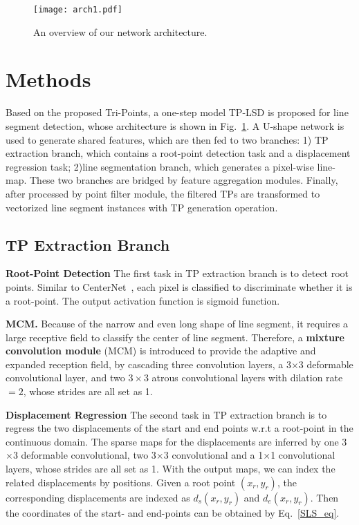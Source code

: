 \documentclass[runningheads]{llncs}
\begin{document}
\begin{figure}[t]
\centering
\texttt{[image: arch1.pdf]}
\caption{An overview of our network architecture.}
\label{arch}
\end{figure}


\section{Methods}


Based on the proposed Tri-Points, a one-step model TP-LSD is proposed for line segment detection, whose architecture is shown in Fig.~\ref{arch}. A U-shape network is used to generate shared features, which are then fed to two branches: 1) TP extraction branch, which contains a root-point detection task and a displacement regression task; 2)line segmentation branch, which generates a pixel-wise line-map. These two branches are bridged by feature aggregation modules. Finally, after processed by point filter module, the filtered TPs are transformed to vectorized line segment instances with TP generation operation.


\subsection{TP Extraction Branch}

\textbf{Root-Point Detection}
The first task in TP extraction branch is to detect root points. Similar to CenterNet~\cite{CenterNet}, each pixel is classified to discriminate whether it is a root-point. The output activation function is sigmoid function.

\textbf{MCM.}
Because of the narrow and even long shape of line segment, it requires a large receptive field to classify the center of line segment. Therefore, a \textbf{mixture convolution module} (MCM) is introduced to provide the adaptive and expanded reception field, by cascading three convolution layers, a 3$\times$3 deformable convolutional layer, and two $3 \times 3$ atrous convolutional layers with dilation rate$=2$, whose strides are all set as 1.

\textbf{Displacement Regression}
The second task in TP extraction branch is to regress the two displacements of the start and end points w.r.t a root-point in the continuous domain. The sparse maps for the displacements are inferred by one 3$\times$3 deformable convolutional, two 3$\times$3 convolutional and a 1$\times$1 convolutional layers, whose strides are all set as 1. With the output maps, we can index the related displacements by positions. Given a root point $(x_r, y_r)$, the corresponding displacements are indexed as $d_s(x_r, y_r)$ and $d_e(x_r, y_r)$. Then the coordinates of the start- and end-points can be obtained by Eq.~\eqref{SLS_eq}.
\end{document}
